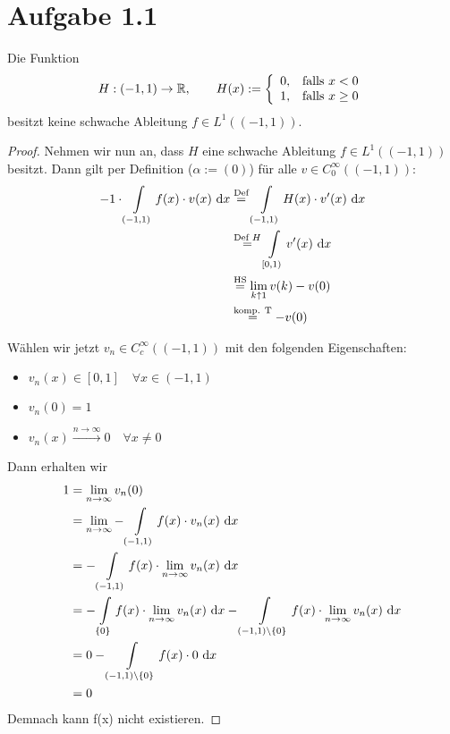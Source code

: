 \documentclass[12pt,a4paper]{article}
\author{Willi Sontopski}
\begin{document}

\section*{Aufgabe 1.1}
Die Funktion
\begin{align*}
H:(-1,1)\to\mathbb{R},\qquad H(x):=\left\lbrace\begin{array}{cl}
0, & \text{falls } x<0\\
1, & \text{falls } x\geq0
\end{array}\right.
\end{align*}
besitzt keine schwache Ableitung $f\in L^1((-1,1))$.
\begin{proof}
Nehmen wir nun an, dass $H$ eine schwache Ableitung $f\in L^1((-1,1))$ besitzt. Dann gilt per Definition ($\alpha:=(0)$) für alle $v\in C_0^\infty((-1,1))$:
\begin{align*}
-1\cdot\int\limits_{(-1,1)} f(x)\cdot v(x)\text{ d} x
&\stackrel{\text{Def}}{=}
\int\limits_{(-1,1)} H(x)\cdot v'(x)\text{ d} x\\
&\stackrel{\text{Def }H}{=}
\int\limits_{[0,1)} v'(x)\text{ d} x\\
&\stackrel{\text{HS}}{=}
\lim\limits_{k\uparrow 1} v(k)-v(0)\\
&\stackrel{\text{komp. T}}{=}
-v(0)
\end{align*}

Wählen wir jetzt $v_n\in C^\infty_c((-1,1))$ mit den folgenden Eigenschaften:
\begin{itemize}
	\item $v_n(x)\in[0,1]\quad \forall x\in (-1,1)$
	\item $v_n(0)=1$
	\item $v_n(x)\stackrel{n\rightarrow\infty}{\longrightarrow}0\quad\forall x\neq 0$
\end{itemize}
Dann erhalten wir
\begin{align*}
	1 &=\lim\limits_{n\rightarrow\infty} v_n(0) \\
	&=\lim\limits_{n\rightarrow\infty}-\int\limits_{(-1,1)} f(x)\cdot v_n(x)\text{ d} x \\
	&=-\int\limits_{(-1,1)} f(x)\cdot\lim\limits_{n\rightarrow\infty} v_n(x)\text{ d} x \\
	&=-\int\limits_{\{0\}} f(x)\cdot\lim\limits_{n\rightarrow\infty} v_n(x)\text{ d} x 
	-\int\limits_{(-1,1)\setminus\{0\}} f(x)\cdot\lim\limits_{n\rightarrow\infty} v_n(x)\text{ d} x \\
	&= 0 -\int\limits_{(-1,1)\setminus\{0\}} f(x)\cdot 0\text{ d} x \\
	&= 0
\end{align*}
Demnach kann f(x) nicht existieren.
\end{proof}
\end{document}

